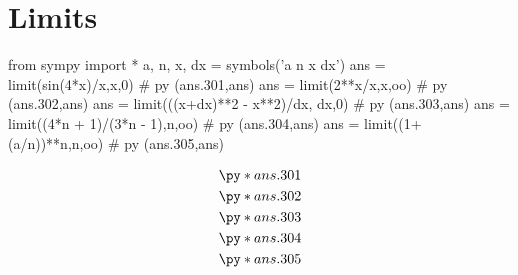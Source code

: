 \section*{Limits}

\vspace{-10pt}

\begin{python}
   from sympy import *
   a, n, x, dx = symbols('a n x dx')
   ans = limit(sin(4*x)/x,x,0)                  # py (ans.301,ans)
   ans = limit(2**x/x,x,oo)                     # py (ans.302,ans)
   ans = limit(((x+dx)**2 - x**2)/dx, dx,0)     # py (ans.303,ans)
   ans = limit((4*n + 1)/(3*n - 1),n,oo)        # py (ans.304,ans)
   ans = limit((1+(a/n))**n,n,oo)               # py (ans.305,ans)
\end{python}

\begin{align*}
   &\py*{ans.301}\\
   &\py*{ans.302}\\
   &\py*{ans.303}\\
   &\py*{ans.304}\\
   &\py*{ans.305}
\end{align*}
